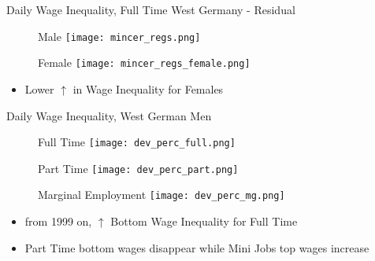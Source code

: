 \documentclass[hyperref={bookmarks=false}]{beamer}
\begin{document}
\begin{appendix}
\begin{frame}{Daily Wage Inequality, Full Time West Germany - Residual}
\begin{figure}[!t]
\centering
\begin{minipage}[b]{0.32\textwidth}{Male}
\centering
\texttt{[image: mincer\_regs.png]}
\end{minipage}
\begin{minipage}[b]{0.32\textwidth}{Female}
\centering
\texttt{[image: mincer\_regs\_female.png]}
\end{minipage}
\end{figure}
\begin{itemize}
\setlength{\itemsep}{0.7 cm}
\item Lower $\uparrow$ in Wage Inequality for Females
\end{itemize}
\end{frame}

\begin{frame}{Daily Wage Inequality, West German Men}
\begin{figure}[!t]
\centering
\begin{minipage}[b]{0.32\textwidth}{Full Time}
\centering
\texttt{[image: dev\_perc\_full.png]}
\end{minipage}
\begin{minipage}[b]{0.32\textwidth}{Part Time}
\centering
\texttt{[image: dev\_perc\_part.png]}
\end{minipage}
\begin{minipage}[b]{0.32\textwidth}{Marginal Employment}
\centering
\texttt{[image: dev\_perc\_mg.png]}
\end{minipage}
\end{figure}
\begin{itemize}
\setlength{\itemsep}{0.7 cm}
\item from 1999 on, $\uparrow$ Bottom Wage Inequality for Full Time
\item  Part Time bottom wages disappear while Mini Jobs top wages increase
\end{itemize}
\end{frame}


\end{appendix}
\end{document}
